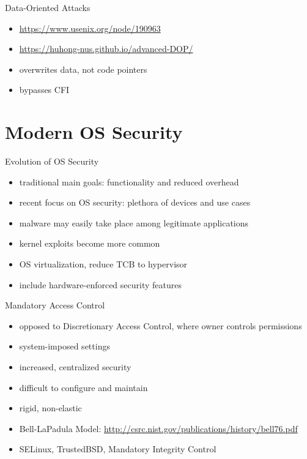 \documentclass{curs}
\begin{document}
\begin{frame}{Data-Oriented Attacks}
  \begin{itemize}
    \pause \item \url{https://www.usenix.org/node/190963}
    \pause \item \url{https://huhong-nus.github.io/advanced-DOP/}
    \pause \item overwrites data, not code pointers
    \pause \item bypasses CFI
  \end{itemize}
\end{frame}

\section{Modern OS Security}

\begin{frame}{Evolution of OS Security}
  \begin{itemize}
    \pause \item traditional main goals: functionality and reduced overhead
    \pause \item recent focus on OS security: plethora of devices and use cases
    \pause \item malware may easily take place among legitimate applications
    \pause \item kernel exploits become more common
    \pause \item OS virtualization, reduce TCB to hypervisor
    \pause \item include hardware-enforced security features
  \end{itemize}
\end{frame}

\begin{frame}{Mandatory Access Control}
  \begin{itemize}
    \pause \item opposed to Discretionary Access Control, where owner controls permissions
    \pause \item system-imposed settings
    \pause \item increased, centralized security
    \pause \item difficult to configure and maintain
    \pause \item rigid, non-elastic
    \pause \item Bell-LaPadula Model: \url{http://csrc.nist.gov/publications/history/bell76.pdf}
    \pause \item SELinux, TrustedBSD, Mandatory Integrity Control
  \end{itemize}
\end{frame}
\end{document}
